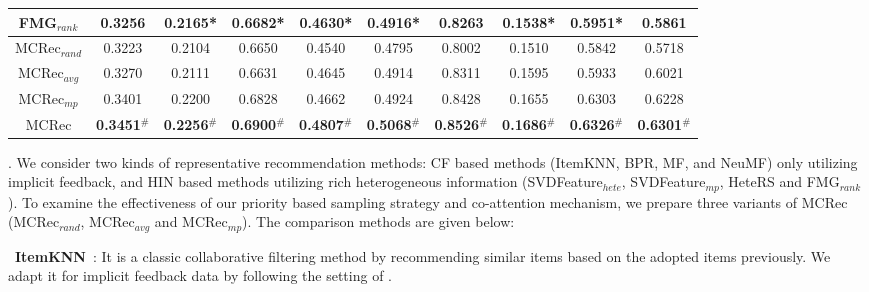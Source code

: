 \begin{table}[t]
{\begin{tabular}{|c||c|c|c||c|c|c||c|c|c|}
\hline
{FMG$_{rank}$} & {0.3256} & {0.2165*} & {0.6682*} & {0.4630*} & {0.4916*} & {0.8263} & {0.1538*} & {0.5951*} & {0.5861}\\
\hline
\hline
{MCRec$_{rand}$} & {0.3223} & {0.2104} & {0.6650} & {0.4540} & {0.4795} & {0.8002} & {0.1510} & {0.5842} & {0.5718} \\
\hline
{MCRec$_{avg}$} & {0.3270} & {0.2111} & {0.6631} & {0.4645} & {0.4914} & {0.8311} & {0.1595} & {0.5933} & {0.6021}\\
\hline
{MCRec$_{mp}$} & {0.3401} & {0.2200} & {0.6828} & {0.4662} & {0.4924} & {0.8428} & {0.1655} & {0.6303} & {0.6228}\\
\hline
{MCRec} & {\textbf{0.3451$^{\#}$}} & {\textbf{0.2256$^{\#}$}} & {\textbf{0.6900$^{\#}$}} & {\textbf{0.4807$^{\#}$}} & {\textbf{0.5068$^{\#}$}} & {\textbf{0.8526$^{\#}$}} & {\textbf{0.1686$^{\#}$}} & {\textbf{0.6326$^{\#}$}} & {\textbf{0.6301$^{\#}$}}\\
\hline
\end{tabular}}
\end{table}

. We consider two kinds of representative recommendation methods: CF based methods (ItemKNN, BPR, MF, and NeuMF) only utilizing implicit feedback, and HIN based methods utilizing rich heterogeneous information (SVDFeature$_{hete}$, SVDFeature$_{mp}$, HeteRS and FMG$_{rank}$). %
 To examine the effectiveness of our priority based sampling strategy and co-attention mechanism, we prepare three variants of MCRec (MCRec$_{rand}$, MCRec$_{avg}$ and MCRec$_{mp}$). The comparison methods are given below: %

\textbullet\ \textbf{ItemKNN}~\cite{sarwar2001item}: It is a classic collaborative filtering method by recommending similar items based on the adopted items previously. We adapt it for implicit feedback data by following the setting of \cite{hu2008collaborative}.


